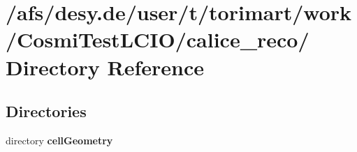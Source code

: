 \section{/afs/desy.de/user/t/torimart/work/CosmiTestLCIO/calice\_\-reco/ Directory Reference}
\label{dir_f98b43a53f5533225f05987ae358305b}
\subsection*{Directories}
\begin{DoxyCompactItemize}
\item 
directory {\bf cellGeometry}
\end{DoxyCompactItemize}
